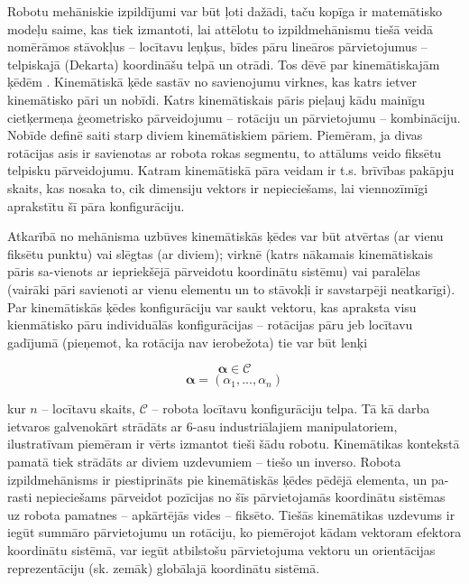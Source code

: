 \documentclass[12pt, a4paper]{article}
\numberwithin{equation}{section} %
\begin{document}
Robotu mehāniskie izpildījumi var būt ļoti dažādi, taču kopīga ir matemātisko modeļu saime, kas tiek izmantoti, lai attēlotu to izpildmehānismu tiešā veidā nomērāmos stāvokļus -- locītavu leņķus, bīdes pāru lineāros pārvietojumus -- telpiskajā (Dekarta) koordināšu telpā un otrādi. Tos dēvē par kinemātiskajām ķēdēm \cite{kinematics_illinois}. Kinemātiskā ķēde sastāv no savienojumu virknes, kas katrs ietver kinemātisko pāri un nobīdi. Katrs kinemātiskais pāris pieļauj kādu mainīgu cietķermeņa ģeometrisko pārveidojumu -- rotāciju un pārvietojumu -- kombināciju. Nobīde definē saiti starp diviem kinemātiskiem pāriem. Piemēram, ja divas rotācijas asis ir savienotas ar robota rokas segmentu, to attālums veido fiksētu telpisku pārveidojumu. Katram kinemātiskā pāra veidam ir t.s. brīvības pakāpju skaits, kas nosaka to, cik dimensiju vektors ir nepieciešams, lai viennozīmīgi aprakstītu šī pāra konfigurāciju.

Atkarībā no mehānisma uzbūves kinemātiskās ķēdes var būt atvērtas (ar vienu fiksētu punktu) vai slēgtas (ar diviem); virknē (katrs nākamais kinemātiskais pāris sa-vienots ar iepriekšējā pārveidotu koordinātu sistēmu) vai paralēlas (vairāki pāri savienoti ar vienu elementu un to stāvokļi ir savstarpēji neatkarīgi). Par kinemātiskās ķēdes konfigurāciju var saukt vektoru, kas apraksta visu kienmātisko pāru individuālās konfigurācijas -- rotācijas pāru jeb locītavu gadījumā (pieņemot, ka rotācija nav ierobežota) tie var būt lenķi


\begin{equation}
    \boldsymbol{\alpha} \in \mathcal{C}
\end{equation}
\begin{equation}
    \boldsymbol{\alpha} = (\alpha_1, ..., \alpha_n)
\end{equation}

kur $n$ -- locītavu skaits, $\mathcal{C}$ -- robota locītavu konfigurāciju telpa. Tā kā darba ietvaros galvenokārt strādāts ar 6-asu industriālajiem manipulatoriem, ilustratīvam piemēram ir vērts izmantot tieši šādu robotu. Kinemātikas kontekstā pamatā tiek strādāts ar diviem uzdevumiem -- tiešo un inverso. Robota izpildmehānisms ir piestiprināts pie kinemātiskās ķēdes pēdējā elementa, un pa-rasti nepieciešams pārveidot pozīcijas no šīs pārvietojamās koordinātu sistēmas uz robota pamatnes -- apkārtējās vides -- fiksēto. Tiešās kinemātikas uzdevums ir iegūt summāro pārvietojumu un rotāciju, ko piemērojot kādam vektoram efektora koordinātu sistēmā, var iegūt atbilstošu pārvietojuma vektoru un orientācijas reprezentāciju (sk. zemāk) globālajā koordinātu sistēmā. 
\end{document}
